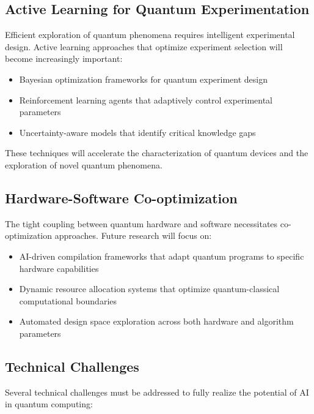\subsection{Active Learning for Quantum Experimentation}
Efficient exploration of quantum phenomena requires intelligent experimental design. Active learning approaches that optimize experiment selection will become increasingly important:

\begin{itemize}
    \item Bayesian optimization frameworks for quantum experiment design
    \item Reinforcement learning agents that adaptively control experimental parameters
    \item Uncertainty-aware models that identify critical knowledge gaps
\end{itemize}

These techniques will accelerate the characterization of quantum devices and the exploration of novel quantum phenomena.

\subsection{Hardware-Software Co-optimization}
The tight coupling between quantum hardware and software necessitates co-optimization approaches. Future research will focus on:

\begin{itemize}
    \item AI-driven compilation frameworks that adapt quantum programs to specific hardware capabilities
    \item Dynamic resource allocation systems that optimize quantum-classical computational boundaries
    \item Automated design space exploration across both hardware and algorithm parameters
\end{itemize}

\subsection{Technical Challenges}
Several technical challenges must be addressed to fully realize the potential of AI in quantum computing:

